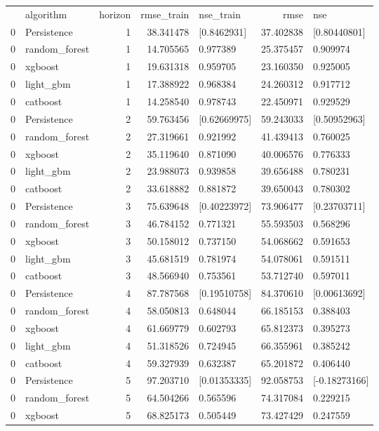\begin{tabular}{llrrlrl}
 & algorithm & horizon & rmse_train & nse_train & rmse & nse \\
0 & Persistence & 1 & 38.341478 & [0.8462931] & 37.402838 & [0.80440801] \\
0 & random_forest & 1 & 14.705565 & 0.977389 & 25.375457 & 0.909974 \\
0 & xgboost & 1 & 19.631318 & 0.959705 & 23.160350 & 0.925005 \\
0 & light_gbm & 1 & 17.388922 & 0.968384 & 24.260312 & 0.917712 \\
0 & catboost & 1 & 14.258540 & 0.978743 & 22.450971 & 0.929529 \\
0 & Persistence & 2 & 59.763456 & [0.62669975] & 59.243033 & [0.50952963] \\
0 & random_forest & 2 & 27.319661 & 0.921992 & 41.439413 & 0.760025 \\
0 & xgboost & 2 & 35.119640 & 0.871090 & 40.006576 & 0.776333 \\
0 & light_gbm & 2 & 23.988073 & 0.939858 & 39.656488 & 0.780231 \\
0 & catboost & 2 & 33.618882 & 0.881872 & 39.650043 & 0.780302 \\
0 & Persistence & 3 & 75.639648 & [0.40223972] & 73.906477 & [0.23703711] \\
0 & random_forest & 3 & 46.784152 & 0.771321 & 55.593503 & 0.568296 \\
0 & xgboost & 3 & 50.158012 & 0.737150 & 54.068662 & 0.591653 \\
0 & light_gbm & 3 & 45.681519 & 0.781974 & 54.078061 & 0.591511 \\
0 & catboost & 3 & 48.566940 & 0.753561 & 53.712740 & 0.597011 \\
0 & Persistence & 4 & 87.787568 & [0.19510758] & 84.370610 & [0.00613692] \\
0 & random_forest & 4 & 58.050813 & 0.648044 & 66.185153 & 0.388403 \\
0 & xgboost & 4 & 61.669779 & 0.602793 & 65.812373 & 0.395273 \\
0 & light_gbm & 4 & 51.318526 & 0.724945 & 66.355961 & 0.385242 \\
0 & catboost & 4 & 59.327939 & 0.632387 & 65.201872 & 0.406440 \\
0 & Persistence & 5 & 97.203710 & [0.01353335] & 92.058753 & [-0.18273166] \\
0 & random_forest & 5 & 64.504266 & 0.565596 & 74.317084 & 0.229215 \\
0 & xgboost & 5 & 68.825173 & 0.505449 & 73.427429 & 0.247559 \\

\end{tabular}
